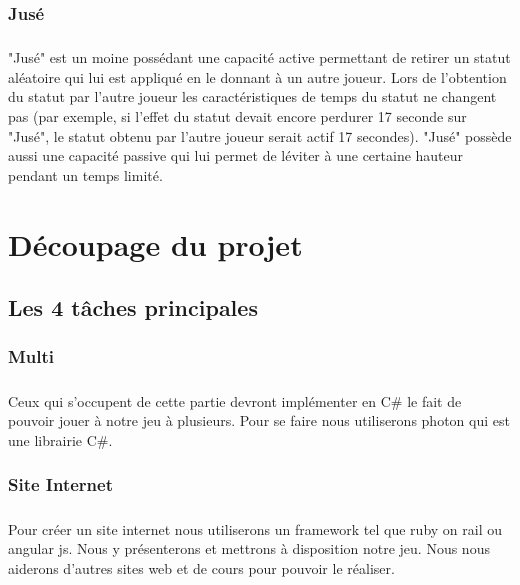 \documentclass[12pt]{report}
\begin{document}
		\subsection{Jusé}
		\paragraph{}
			"Jusé" est un moine possédant une capacité active permettant de retirer un statut aléatoire qui lui est appliqué en le donnant à un autre joueur. Lors de l'obtention du statut par l'autre joueur les caractéristiques de temps du statut ne changent pas (par exemple, si l'effet du statut devait encore perdurer 17 seconde sur "Jusé", le statut obtenu par l'autre joueur serait actif 17 secondes).  "Jusé" possède aussi une capacité passive qui lui permet de léviter à une certaine hauteur pendant un temps limité.
					
\chapter{Découpage du projet} %

	\section{Les 4 tâches principales}
	
		\subsection{Multi}
		\paragraph{}
Ceux qui s'occupent de cette partie devront implémenter en C\# le 
fait de pouvoir jouer à notre jeu à plusieurs. Pour se faire nous
utiliserons photon qui est une librairie C\#. 

		\subsection{Site Internet}
		\paragraph{}
Pour créer un site internet nous utiliserons un framework tel que
ruby on rail ou angular js. Nous y présenterons et mettrons à
disposition notre jeu. Nous nous aiderons d'autres sites web et 
de cours pour pouvoir le réaliser.
\end{document}
